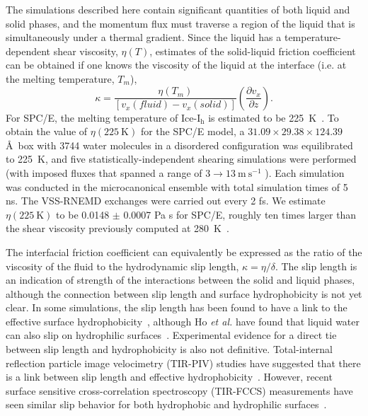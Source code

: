 \documentclass[aps,jcp,preprint,showpacs,superscriptaddress,groupedaddress]{revtex4}  %
\begin{document}
The simulations described here contain significant quantities of both
liquid and solid phases, and the momentum flux must traverse a region
of the liquid that is simultaneously under a thermal gradient.  Since
the liquid has a temperature-dependent shear viscosity, $\eta(T)$,
estimates of the solid-liquid friction coefficient can be obtained if
one knows the viscosity of the liquid at the interface (i.e. at the
melting temperature, $T_m$),
\begin{equation}\label{kappa-2}
\kappa = \frac{\eta(T_{m})}{\left[v_{x}(fluid)-v_{x}(solid)\right]}\left(\frac{\partial v_{x}}{\partial z}\right).
\end{equation}
For SPC/E, the melting temperature of Ice-I$_\mathrm{h}$ is estimated
to be 225~K~\cite{Bryk02}.  To obtain the value of
$\eta(225\mathrm{~K})$ for the SPC/E model, a $31.09 \times 29.38
\times 124.39$ \AA\ box with 3744 water molecules in a disordered
configuration was equilibrated to 225~K, and five
statistically-independent shearing simulations were performed (with
imposed fluxes that spanned a range of $3 \rightarrow 13
\mathrm{~m~s}^{-1}$ ).  Each simulation was conducted in the
microcanonical ensemble with total simulation times of 5 ns. The
VSS-RNEMD exchanges were carried out every 2 fs. We estimate
$\eta(225\mathrm{~K})$ to be 0.0148 $\pm$ 0.0007 Pa s for SPC/E,
roughly ten times larger than the shear viscosity previously computed
at 280~K~\cite{Kuang12}.

The interfacial friction coefficient can equivalently be expressed as
the ratio of the viscosity of the fluid to the hydrodynamic slip
length, $\kappa = \eta / \delta$. The slip length is an indication of
strength of the interactions between the solid and liquid phases,
although the connection between slip length and surface hydrophobicity
is not yet clear. In some simulations, the slip length has been found
to have a link to the effective surface
hydrophobicity~\cite{Sendner:2009uq}, although Ho \textit{et al.} have
found that liquid water can also slip on hydrophilic
surfaces~\cite{Ho:2011zr}. Experimental evidence for a direct tie
between slip length and hydrophobicity is also not
definitive. Total-internal reflection particle image velocimetry
(TIR-PIV) studies have suggested that there is a link between slip
length and effective
hydrophobicity~\cite{Lasne:2008vn,Bouzigues:2008ys}. However, recent
surface sensitive cross-correlation spectroscopy (TIR-FCCS)
measurements have seen similar slip behavior for both hydrophobic and
hydrophilic surfaces~\cite{Schaeffel:2013kx}.
\end{document}

